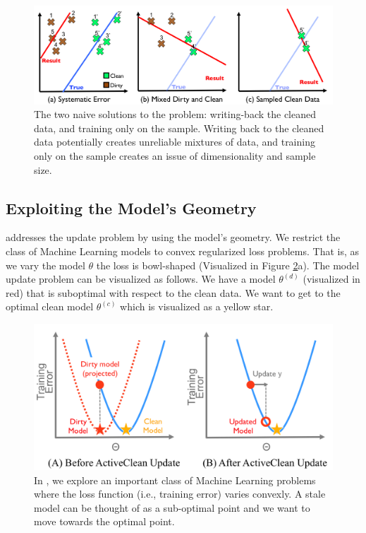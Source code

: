 \begin{figure}[ht!]
\centering
 \includegraphics[width=\columnwidth]{figs/update-arch.png}
 \caption{The two naive solutions to the problem: writing-back the cleaned data, and training only on the sample. Writing back to the cleaned data potentially creates unreliable mixtures of data, and training only on the sample creates an issue of dimensionality and sample size. \label{update-arch1}}
\end{figure}

\subsection{Exploiting the Model's Geometry}
\sys addresses the update problem by using the model's geometry.
We restrict the class of Machine Learning models to convex regularized loss problems.
That is, as we vary the model $\theta$ the loss is bowl-shaped (Visualized in Figure \ref{update-arch2}a).
The model update problem can be visualized as follows.
We have a model $\theta^{(d)}$ (visualized in red) that is suboptimal with respect to the clean data.
We want to get to the optimal clean model $\theta^{(c)}$ which is visualized as a yellow star.

\begin{figure}[ht!]
\centering
 \includegraphics[width=\columnwidth]{figs/update-arch2.png}
 \caption{In \sys, we explore an important class of Machine Learning problems where the loss function (i.e., training error) varies convexly. A stale model can be thought of as a sub-optimal point and we want to move towards the optimal point. \label{update-arch2}}
\end{figure}

